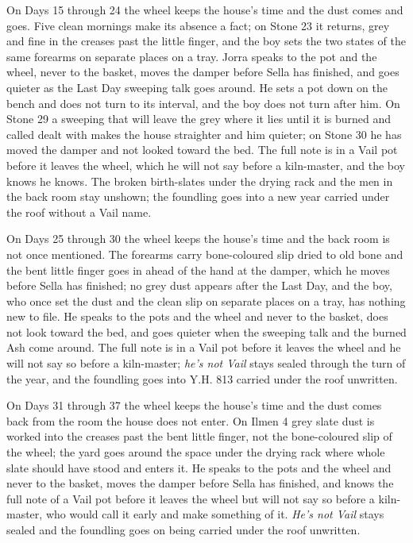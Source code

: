 \documentclass{design/chronicle}
\begin{document}
{On Days 15 through 24 the wheel keeps the house’s time and the dust comes and goes. Five clean mornings make its absence a fact; on Stone 23 it returns, grey and fine in the creases past the little finger, and the boy sets the two states of the same forearms on separate places on a tray. Jorra speaks to the pot and the wheel, never to the basket, moves the damper before Sella has finished, and goes quieter as the Last Day sweeping talk goes around. He sets a pot down on the bench and does not turn to its interval, and the boy does not turn after him. On Stone 29 a sweeping that will leave the grey where it lies until it is burned and called dealt with makes the house straighter and him quieter; on Stone 30 he has moved the damper and not looked toward the bed. The full note is in a Vail pot before it leaves the wheel, which he will not say before a kiln-master, and the boy knows he knows. The broken birth-slates under the drying rack and the men in the back room stay unshown; the foundling goes into a new year carried under the roof without a Vail name.

On Days 25 through 30 the wheel keeps the house’s time and the back room is not once mentioned. The forearms carry bone-coloured slip dried to old bone and the bent little finger goes in ahead of the hand at the damper, which he moves before Sella has finished; no grey dust appears after the Last Day, and the boy, who once set the dust and the clean slip on separate places on a tray, has nothing new to file. He speaks to the pots and the wheel and never to the basket, does not look toward the bed, and goes quieter when the sweeping talk and the burned Ash come around. The full note is in a Vail pot before it leaves the wheel and he will not say so before a kiln-master; \emph{he’s not Vail} stays sealed through the turn of the year, and the foundling goes into Y.H. 813 carried under the roof unwritten.

On Days 31 through 37 the wheel keeps the house’s time and the dust comes back from the room the house does not enter. On Ilmen 4 grey slate dust is worked into the creases past the bent little finger, not the bone-coloured slip of the wheel; the yard goes around the space under the drying rack where whole slate should have stood and enters it. He speaks to the pots and the wheel and never to the basket, moves the damper before Sella has finished, and knows the full note of a Vail pot before it leaves the wheel but will not say so before a kiln-master, who would call it early and make something of it. \emph{He’s not Vail} stays sealed and the foundling goes on being carried under the roof unwritten.

}
\end{document}
